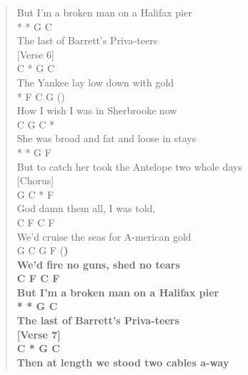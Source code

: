 \documentclass[11pt]{article}
\begin{document}
\begin{verse}
{But I'm a broken man on a Halifax pier\\
\hspace*{4em}*       *         G     C\\
The last of Barrett's Priva-teers\\
\vspace*{1em}
[Verse 6]\\
\hspace*{4em}C      *       G         C\\
The Yankee lay low down with gold\\
\hspace*{6em}*      F      C          G     (})\\
How I wish I was in Sherbrooke now\\
\hspace*{8em}C         G       C        *\\
She was broad and fat and loose in stays\\
\hspace*{7em}*                  *        G         F\\
But to catch her took the Antelope two whole days\\
\vspace*{1em}
[Chorus]\\
\hspace*{4em}G         C    *     F\\
God damn them all, I was told,\\
\hspace*{5em}C          F          C       F\\
We'd cruise the seas for A-merican gold\\
\hspace*{5em}G       C     G       F     (\textbf{)\\
We'd fire no guns, shed no tears\\
\hspace*{10em}C      F        C       F\\
But I'm a broken man on a Halifax pier\\
\hspace*{4em}*       *         G     C\\
The last of Barrett's Priva-teers\\
\vspace*{1em}
[Verse 7]\\
\hspace*{8em}C         *         G        C\\
Then at length we stood two cables a-way\\
}
\end{verse}
\end{document}
